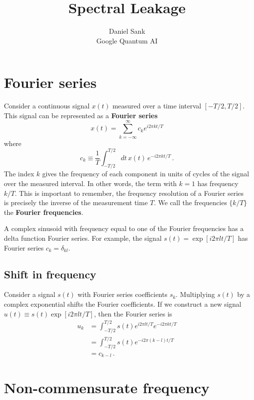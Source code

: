 \documentclass[twocolumn]{article}
\title{Spectral Leakage}
\author{Daniel Sank \\ \small{Google Quantum AI}}
\begin{document}
\maketitle


\section{Fourier series}

Consider a continuous signal $x(t)$ measured over a time interval $[-T/2, T/2]$.
This signal can be represented as a \textbf{Fourier series}
\begin{equation}
x(t) = \sum_{k=-\infty}^\infty c_k e^{i 2 \pi k t / T}
\end{equation}
where
\begin{equation}
c_k \equiv \frac{1}{T} \int_{-T/2}^{T/2} dt \, x(t) \, e^{-i 2 \pi k t / T} \, .
\end{equation}
The index $k$ gives the frequency of each component in units of cycles of the signal over the measured interval.
In other words, the term with $k=1$ has frequency $k/T$.
This is important to remember, the frequency resolution of a Fourier series is precisely the inverse of the measurement time $T$.
We call the frequencies $\{k/T\}$ the \textbf{Fourier frequencies}.

A complex sinusoid with frequency equal to one of the Fourier frequencies has a delta function Fourier series.
For example, the signal $s(t) = \exp \left[ i 2 \pi l t / T \right]$ has Fourier series $c_k = \delta_{kl}$.

\subsection{Shift in frequency}

Consider a signal $s(t)$ with Fourier series coefficients $s_k$.
Multiplying $s(t)$ by a complex exponential shifts the Fourier coefficients.
If we construct a new signal $u(t) \equiv s(t) \exp[i2\pi l t / T]$, then the Fourier series is
\begin{align}
u_k
&= \int_{-T/2}^{T/2} s(t) e^{i 2 \pi l t / T} e^{-i 2 \pi k t/ T} \nonumber \\
&= \int_{-T/2}^{T/2} s(t) e^{-i 2 \pi (k-l) t/ T} \nonumber \\
&= c_{k-l} \, .
\end{align}


\section{Non-commensurate frequency}
\end{document}
